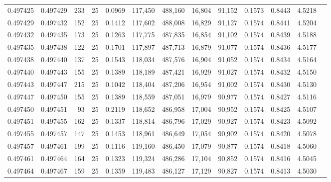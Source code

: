 \begin{tabular}{rrrrrrrrrrrrr}
0.497425 & 0.497429 & 233 &  25 &                                     0.0969 & 117,450 & 488,160 &  16,804 &  91,152 & 0.1573 & 0.8443 & 4.5218 \\
0.497429 & 0.497432 & 152 &  25 &                                     0.1412 & 117,602 & 488,008 &  16,829 &  91,127 & 0.1574 & 0.8441 & 4.5204 \\
0.497432 & 0.497435 & 173 &  25 &                                     0.1263 & 117,775 & 487,835 &  16,854 &  91,102 & 0.1574 & 0.8439 & 4.5188 \\
0.497435 & 0.497438 & 122 &  25 &                                     0.1701 & 117,897 & 487,713 &  16,879 &  91,077 & 0.1574 & 0.8436 & 4.5177 \\
0.497438 & 0.497440 & 137 &  25 &                                     0.1543 & 118,034 & 487,576 &  16,904 &  91,052 & 0.1574 & 0.8434 & 4.5164 \\
0.497440 & 0.497443 & 155 &  25 &                                     0.1389 & 118,189 & 487,421 &  16,929 &  91,027 & 0.1574 & 0.8432 & 4.5150 \\
0.497443 & 0.497447 & 215 &  25 &                                     0.1042 & 118,404 & 487,206 &  16,954 &  91,002 & 0.1574 & 0.8430 & 4.5130 \\
0.497447 & 0.497450 & 155 &  25 &                                     0.1389 & 118,559 & 487,051 &  16,979 &  90,977 & 0.1574 & 0.8427 & 4.5116 \\
0.497450 & 0.497451 &  93 &  25 &                                     0.2119 & 118,652 & 486,958 &  17,004 &  90,952 & 0.1574 & 0.8425 & 4.5107 \\
0.497451 & 0.497455 & 162 &  25 &                                     0.1337 & 118,814 & 486,796 &  17,029 &  90,927 & 0.1574 & 0.8423 & 4.5092 \\
0.497455 & 0.497457 & 147 &  25 &                                     0.1453 & 118,961 & 486,649 &  17,054 &  90,902 & 0.1574 & 0.8420 & 4.5078 \\
0.497457 & 0.497461 & 199 &  25 &                                     0.1116 & 119,160 & 486,450 &  17,079 &  90,877 & 0.1574 & 0.8418 & 4.5060 \\
0.497461 & 0.497464 & 164 &  25 &                                     0.1323 & 119,324 & 486,286 &  17,104 &  90,852 & 0.1574 & 0.8416 & 4.5045 \\
0.497464 & 0.497467 & 159 &  25 &                                     0.1359 & 119,483 & 486,127 &  17,129 &  90,827 & 0.1574 & 0.8413 & 4.5030 \\

\end{tabular}
